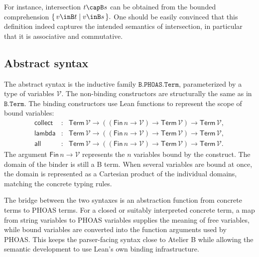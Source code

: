 \begin{example}
  For instance, intersection \( t \capB s \) can be obtained from the bounded comprehension
  \(
    \{\,v \inB t \mid v \inB s\,\}.
  \)
  One should be easily convinced that this definition indeed captures the intended semantics of intersection, in particular that it is associative and commutative.
\end{example}

\subsection{Abstract syntax}
\label{subsec:b-abstract-syntax}

The abstract syntax is the inductive family
\(\texttt{B.PHOAS.Term}\), parameterized by a type of variables
\(\mathcal V\).
The non-binding constructors are structurally the same as in
\(\texttt{B.Term}\).
The binding constructors use Lean functions to represent the scope of bound
variables:
\[
\begin{array}{rcl}
\mathsf{collect} &:&
  \mathsf{Term}\,\mathcal V \to ((\mathsf{Fin}\,n \to \mathcal V) \to \mathsf{Term}\,\mathcal V) \to \mathsf{Term}\,\mathcal V,\\
\mathsf{lambda} &:&
  \mathsf{Term}\,\mathcal V \to ((\mathsf{Fin}\,n \to \mathcal V) \to \mathsf{Term}\,\mathcal V) \to \mathsf{Term}\,\mathcal V,\\
\mathsf{all} &:&
  \mathsf{Term}\,\mathcal V \to ((\mathsf{Fin}\,n \to \mathcal V) \to \mathsf{Term}\,\mathcal V) \to \mathsf{Term}\,\mathcal V.
\end{array}
\]
The argument \(\mathsf{Fin}\,n \to \mathcal V\) represents the \(n\) variables
bound by the construct.
The domain of the binder is still a B term.
When several variables are bound at once, the domain is represented as a
Cartesian product of the individual domains, matching the concrete typing
rules.

The bridge between the two syntaxes is an abstraction function from concrete
terms to PHOAS terms.
For a closed or suitably interpreted concrete term, a map from string variables
to PHOAS variables supplies the meaning of free variables, while bound
variables are converted into the function arguments used by PHOAS.
This keeps the parser-facing syntax close to Atelier B while allowing the
semantic development to use Lean's own binding infrastructure.
